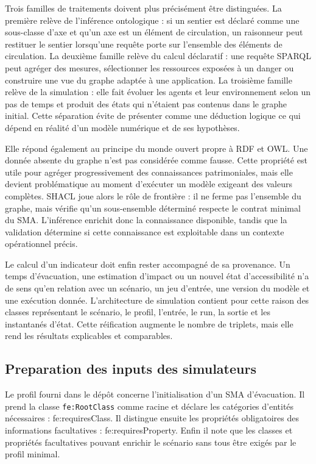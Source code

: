 \documentclass{article}
\begin{document}
Trois familles de traitements doivent plus précisément être distinguées. La première relève de l'inférence ontologique : si un sentier est déclaré comme une sous-classe d'axe et qu'un axe est un élément de circulation, un raisonneur peut restituer le sentier lorsqu'une requête porte sur l'ensemble des éléments de circulation. La deuxième famille relève du calcul déclaratif : une requête SPARQL peut agréger des mesures, sélectionner les ressources exposées à un danger ou construire une vue du graphe adaptée à une application. La troisième famille relève de la simulation : elle fait évoluer les agents et leur environnement selon un pas de temps et produit des états qui n'étaient pas contenus dans le graphe initial. Cette séparation évite de présenter comme une déduction logique ce qui dépend en réalité d'un modèle numérique et de ses hypothèses.

Elle répond également au principe du monde ouvert propre à RDF et OWL. Une donnée absente du graphe n'est pas considérée comme fausse. Cette propriété est utile pour agréger progressivement des connaissances patrimoniales, mais elle devient problématique au moment d'exécuter un modèle exigeant des valeurs complètes. SHACL joue alors le rôle de frontière : il ne ferme pas l'ensemble du graphe, mais vérifie qu'un sous-ensemble déterminé respecte le contrat minimal du SMA. L'inférence enrichit donc la connaissance disponible, tandis que la validation détermine si cette connaissance est exploitable dans un contexte opérationnel précis.

Le calcul d'un indicateur doit enfin rester accompagné de sa provenance. Un temps d'évacuation, une estimation d'impact ou un nouvel état d'accessibilité n'a de sens qu'en relation avec un scénario, un jeu d'entrée, une version du modèle et une exécution donnée. L'architecture de simulation contient pour cette raison des classes représentant le scénario, le profil, l'entrée, le run, la sortie et les instantanés d'état. Cette réification augmente le nombre de triplets, mais elle rend les résultats explicables et comparables.

\subsection{Preparation des inputs des simulateurs}

Le profil fourni dans le dépôt concerne l'initialisation d'un SMA d'évacuation. Il prend la classe \texttt{fe:RootClass} comme racine et déclare les catégories d'entités nécessaires : fe:requiresClass. Il distingue ensuite les propriétés obligatoires des informations facultatives : fe:requiresProperty. Enfin il note que les classes et propriétés facultatives pouvant enrichir le scénario sans tous être exigés par le profil minimal.
\end{document}
